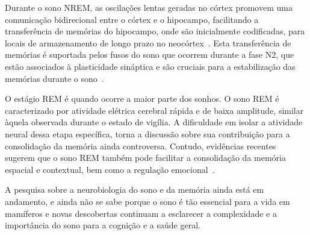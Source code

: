 Durante o sono NREM, as oscilações lentas geradas no córtex promovem uma comunicação bidirecional entre o córtex e o hipocampo,
facilitando a transferência de memórias do hipocampo, onde são inicialmente codificadas, para locais de armazenamento de longo
prazo no neocórtex~\cite{diekelmannMemory2010}. Esta transferência de memórias é suportada pelos fusos do sono que ocorrem durante
a fase N2, que estão associados à plasticidade sináptica e são cruciais para a estabilização das memórias durante o
sono~\cite{raschReactivation2008, peyracheMechanism2020}.

O estágio REM é quando ocorre a maior parte dos sonhos. O sono REM é caracterizado por atividade elétrica cerebral rápida e de
baixa amplitude, similar àquela observada durante o estado de vigília. A dificuldade em isolar a atividade neural dessa etapa
específica, torna a discussão sobre sua contribuição para a consolidação da memória ainda controversa. Contudo, evidências
recentes sugerem que o sono REM também pode facilitar a consolidação da memória espacial e contextual, bem como a regulação
emocional~\cite{payneSleep2012, boyceREM2017}.

A pesquisa sobre a neurobiologia do sono e da memória ainda está em andamento, e ainda não se sabe porque o sono é tão essencial
para a vida em mamíferos e novas descobertas continuam a esclarecer a complexidade e a importância do sono para a cognição e a
saúde geral.
